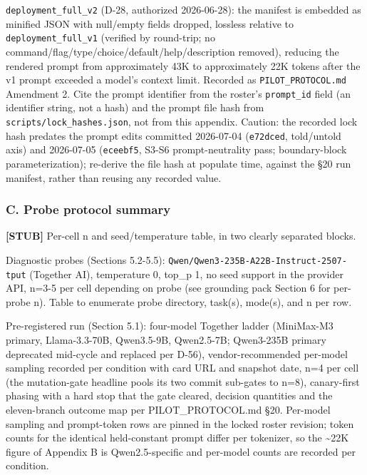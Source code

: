 \documentclass[
]{article}
\begin{document}
\texttt{deployment\_full\_v2} (D-28, authorized 2026-06-28): the
manifest is embedded as minified JSON with null/empty fields dropped,
lossless relative to \texttt{deployment\_full\_v1} (verified by
round-trip; no command/flag/type/choice/default/help/description
removed), reducing the rendered prompt from approximately 43K to
approximately 22K tokens after the v1 prompt exceeded a model's context
limit. Recorded as \texttt{PILOT\_PROTOCOL.md} Amendment 2. Cite the
prompt identifier from the roster's \texttt{prompt\_id} field (an
identifier string, not a hash) and the prompt file hash from
\texttt{scripts/lock\_hashes.json}, not from this appendix. Caution: the
recorded lock hash predates the prompt edits committed 2026-07-04
(\texttt{e72dced}, told/untold axis) and 2026-07-05 (\texttt{eceebf5},
S3-S6 prompt-neutrality pass; boundary-block parameterization);
re-derive the file hash at populate time, against the §20 run manifest,
rather than reusing any recorded value.

\subsubsection{C. Probe protocol
summary}\label{c.-probe-protocol-summary}

\textbf{{[}STUB{]}} Per-cell n and seed/temperature table, in two
clearly separated blocks.

Diagnostic probes (Sections 5.2-5.5):
\texttt{Qwen/Qwen3-235B-A22B-Instruct-2507-tput} (Together AI),
temperature 0, top\_p 1, no seed support in the provider API, n=3-5 per
cell depending on probe (see grounding pack Section 6 for per-probe n).
Table to enumerate probe directory, task(s), mode(s), and n per row.

Pre-registered run (Section 5.1): four-model Together ladder (MiniMax-M3
primary, Llama-3.3-70B, Qwen3.5-9B, Qwen2.5-7B; Qwen3-235B primary
deprecated mid-cycle and replaced per D-56), vendor-recommended
per-model sampling recorded per condition with card URL and snapshot
date, n=4 per cell (the mutation-gate headline pools its two commit
sub-gates to n=8), canary-first phasing with a hard stop that the gate
cleared, decision quantities and the eleven-branch outcome map per
PILOT\_PROTOCOL.md §20. Per-model sampling and prompt-token rows are
pinned in the locked roster revision; token counts for the identical
held-constant prompt differ per tokenizer, so the \textasciitilde22K
figure of Appendix B is Qwen2.5-specific and per-model counts are
recorded per condition.
\end{document}
